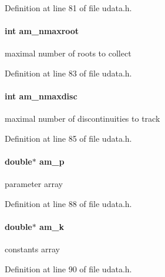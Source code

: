 Definition at line 81 of file udata.\+h.

\hypertarget{struct_user_data_a2c6b0a170bd534f68ab5b216629055a8}{}
\paragraph[{am\+\_\+nmaxroot}]{\setlength{\rightskip}{0pt plus 5cm}int am\+\_\+nmaxroot}\label{struct_user_data_a2c6b0a170bd534f68ab5b216629055a8}
maximal number of roots to collect 

Definition at line 83 of file udata.\+h.

\hypertarget{struct_user_data_a57c79c232bf5d88b7dd1b3cb5947366b}{}
\paragraph[{am\+\_\+nmaxdisc}]{\setlength{\rightskip}{0pt plus 5cm}int am\+\_\+nmaxdisc}\label{struct_user_data_a57c79c232bf5d88b7dd1b3cb5947366b}
maximal number of discontinuities to track 

Definition at line 85 of file udata.\+h.

\hypertarget{struct_user_data_a1a679b0e8dfea7d284d777c937d8d13e}{}
\paragraph[{am\+\_\+p}]{\setlength{\rightskip}{0pt plus 5cm}double$\ast$ am\+\_\+p}\label{struct_user_data_a1a679b0e8dfea7d284d777c937d8d13e}
parameter array 

Definition at line 88 of file udata.\+h.

\hypertarget{struct_user_data_a7b59855746129befdcfe9f3c8a4d2a4c}{}
\paragraph[{am\+\_\+k}]{\setlength{\rightskip}{0pt plus 5cm}double$\ast$ am\+\_\+k}\label{struct_user_data_a7b59855746129befdcfe9f3c8a4d2a4c}
constants array 

Definition at line 90 of file udata.\+h.

